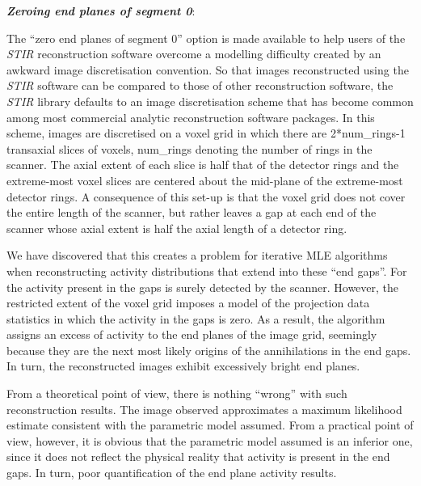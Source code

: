 \documentclass{article}
\begin{document}
\textbf{\textit{Zeroing end planes of segment 0}}: 


The ``zero end planes of segment 0'' option is made available 
to help users of the \textit{STIR} reconstruction software overcome 
a modelling difficulty created by an awkward image discretisation 
convention. So that images reconstructed using the \textit{STIR} software 
can be compared to those of other reconstruction software, the \textit{STIR} 
library defaults to an image discretisation scheme that has become 
common among most commercial analytic reconstruction software 
packages. In this scheme, images are discretised on a voxel grid 
in which there are 2*num\_rings-1 transaxial slices of voxels, 
num\_rings denoting the number of rings in the scanner. The axial 
extent of each slice is half that of the detector rings and the 
extreme-most voxel slices are centered about the mid-plane of 
the extreme-most detector rings. A consequence of this set-up 
is that the voxel grid does not cover the entire length of the 
scanner, but rather leaves a gap at each end of the scanner whose 
axial extent is half the axial length of a detector ring.



We have discovered that this creates a problem for iterative 
MLE algorithms when reconstructing activity distributions that 
extend into these ``end gaps''. For the activity present in the 
gaps is surely detected by the scanner. However, the restricted 
extent of the voxel grid imposes a model of the projection data 
statistics in which the activity in the gaps is zero. As a result, 
the algorithm assigns an excess of activity to the end planes 
of the image grid, seemingly because they are the next most likely 
origins of the annihilations in the end gaps. In turn, the reconstructed 
images exhibit excessively bright end planes.



From a theoretical point of view, there is nothing ``wrong'' with 
such reconstruction results. The image observed approximates 
a maximum likelihood estimate consistent with the parametric 
model assumed. From a practical point of view, however, it is 
obvious that the parametric model assumed is an inferior one, 
since it does not reflect the physical reality that activity 
is present in the end gaps. In turn, poor quantification of the 
end plane activity results. 
\end{document}
